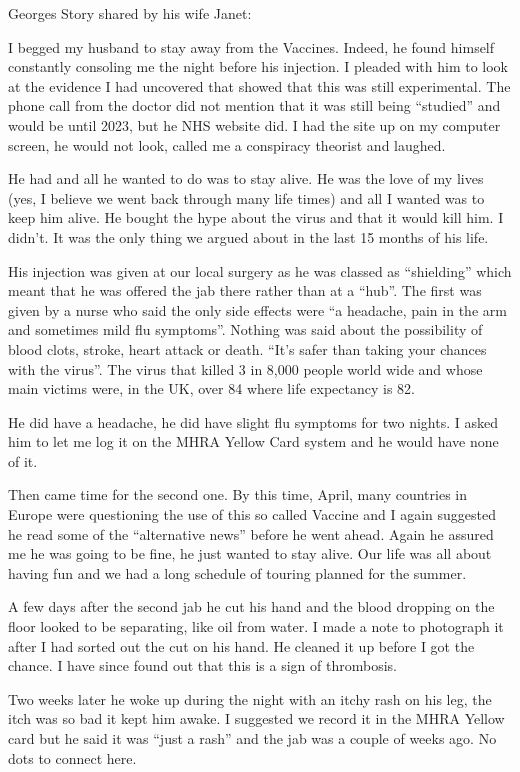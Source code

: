 Georges Story shared by his wife Janet:

I begged my husband to stay away from the Vaccines. Indeed, he found himself
constantly consoling me the night before his injection. I pleaded with him to
look at the evidence I had uncovered that showed that this was still
experimental. The phone call from the doctor did not mention that it was still
being “studied” and would be until 2023, but he NHS website did. I had the site
up on my computer screen, he would not look, called me a conspiracy theorist and
laughed.

He had  and all he wanted to do was to stay alive. He was
the love of my lives (yes, I believe we went back through many life times) and
all I wanted was to keep him alive. He bought the hype about the virus and that
it would kill him. I didn’t. It was the only thing we argued about in the last
15 months of his life.

His injection was given at our local surgery as he was classed as “shielding”
which meant that he was offered the jab there rather than at a “hub”. The first
was given by a nurse who said the only side effects were “a headache, pain in
the arm and sometimes mild flu symptoms”. Nothing was said about the possibility
of blood clots, stroke, heart attack or death. “It’s safer than taking your
chances with the virus”. The virus that killed 3 in 8,000 people world wide and
whose main victims were, in the UK, over 84 where life expectancy is 82.

He did have a headache, he did have slight flu symptoms for two nights. I asked
him to let me log it on the MHRA Yellow Card system and he would have none of
it.

Then came time for the second one. By this time, April, many countries in Europe
were questioning the use of this so called Vaccine and I again suggested he read
some of the “alternative news” before he went ahead. Again he assured me he was
going to be fine, he just wanted to stay alive. Our life was all about having
fun and we had a long schedule of touring planned for the summer.

A few days after the second jab he cut his hand and the blood dropping on the
floor looked to be separating, like oil from water. I made a note to photograph
it after I had sorted out the cut on his hand. He cleaned it up before I got the
chance. I have since found out that this is a sign of thrombosis.

Two weeks later he woke up during the night with an itchy rash on his leg, the
itch was so bad it kept him awake. I suggested we record it in the MHRA Yellow
card but he said it was “just a rash” and the jab was a couple of weeks ago. No
dots to connect here.


